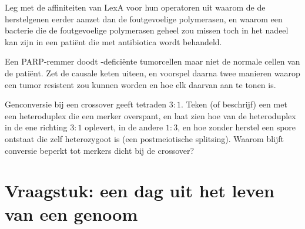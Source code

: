 \begin{exercise}[$\star\star\star$]\label{exo:b3:dna-repair:10}
Leg met de affiniteiten van LexA voor hun operatoren uit waarom de
 de herstelgenen eerder aanzet dan de foutgevoelige
polymerasen, en waarom een bacterie die de foutgevoelige polymerasen
geheel zou missen toch in het nadeel kan zijn in een patiënt die met
antibiotica wordt behandeld.
\end{exercise}

\begin{exercise}[$\star\star\star$]\label{exo:b3:dna-repair:11}
Een PARP-remmer doodt \emph{}-deficiënte tumorcellen maar niet de
normale cellen van de patiënt. Zet de causale keten uiteen, en voorspel
daarna twee manieren waarop een tumor resistent zou kunnen worden en
hoe elk daarvan aan te tonen is.
\end{exercise}

\begin{exercise}[$\star\star\star$]\label{exo:b3:dna-repair:12}
Genconversie bij een crossover geeft tetraden $3{:}1$. Teken (of
beschrijf) een  met een heteroduplex die een merker
overspant, en laat zien hoe  van de heteroduplex in de
ene richting $3{:}1$ oplevert, in de andere $1{:}3$, en hoe zonder
herstel een spore ontstaat die zelf heterozygoot is (een
postmeiotische splitsing). Waarom blijft conversie beperkt tot merkers
dicht bij de crossover?
\end{exercise}

\section{Vraagstuk: een dag uit het leven van een genoom}

